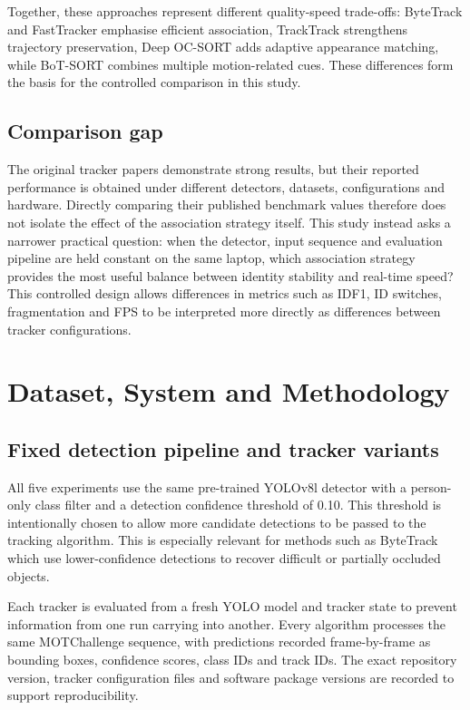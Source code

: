 \documentclass[11pt,a4paper]{article}
\begin{document}
Together, these approaches represent different quality-speed trade-offs: ByteTrack and FastTracker emphasise efficient association, TrackTrack strengthens trajectory preservation, Deep OC-SORT adds adaptive appearance matching, while BoT-SORT combines multiple motion-related cues. These differences form the basis for the controlled comparison in this study.

\subsection{Comparison gap}

The original tracker papers demonstrate strong results, but their reported performance is obtained under different detectors, datasets, configurations and hardware. Directly comparing their published benchmark values therefore does not isolate the effect of the association strategy itself. This study instead asks a narrower practical question: when the detector, input sequence and evaluation pipeline are held constant on the same laptop, which association strategy provides the most useful balance between identity stability and real-time speed? This controlled design allows differences in metrics such as IDF1, ID switches, fragmentation and FPS to be interpreted more directly as differences between tracker configurations.

\section{Dataset, System and Methodology}

\subsection{Fixed detection pipeline and tracker variants}

All five experiments use the same pre-trained YOLOv8l detector with a person-only class filter and a detection confidence threshold of 0.10. This threshold is intentionally chosen to allow more candidate detections to be passed to the tracking algorithm. This is especially relevant for methods such as ByteTrack which use lower-confidence detections to recover difficult or partially occluded objects.

Each tracker is evaluated from a fresh YOLO model and tracker state to prevent information from one run carrying into another. Every algorithm processes the same MOTChallenge sequence, with predictions recorded frame-by-frame as bounding boxes, confidence scores, class IDs and track IDs. The exact repository version, tracker configuration files and software package versions are recorded to support reproducibility.
\end{document}
